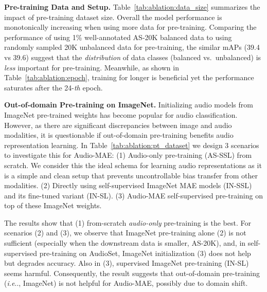 \documentclass{article}
\makeatletter
\DeclareRobustCommand\onedot{\futurelet\@let@token\@onedot}
\def\@onedot{\ifx\@let@token.\else.\null\fi\xspace}
\def\ie{\emph{i.e}\onedot} \def\Ie{\emph{I.e}\onedot}
\renewcommand{\paragraph}[1]{\vspace{1.25mm}\noindent\textbf{#1}}
\makeatother
\begin{document}
\paragraph{Pre-training Data and Setup.}
Table~\ref{tab:ablation:data_size} summarizes the impact of pre-training dataset size. 
Overall the model performance is monotonically increasing when using more data for pre-training.
Comparing the performance of using 1\% well-annotated AS-20K balanced data to using randomly sampled 20K unbalanced data for pre-training, the similar mAPs (39.4 vs 39.6) suggest that the \textit{distribution} of data classes (balanced vs.\ unbalanced) is \textit{less} important for pre-training.
Meanwhile, as shown in Table~\ref{tab:ablation:epoch},
training for longer is beneficial yet the performance saturates after the 24-\textit{th} epoch.


\paragraph{Out-of-domain Pre-training on ImageNet.} 
Initializing audio models from ImageNet pre-trained weights has become popular for audio classification. 
However, as there are significant discrepancies between image and audio modalities, 
it is questionable if out-of-domain pre-training benefits audio representation learning.
In Table~\ref{tab:ablation:pt_dataset} we design 3 scenarios to investigate this for Audio-MAE:
(1) Audio-only pre-training (AS-SSL) from scratch. 
We consider this the ideal schema for learning audio representations as it is a simple and clean setup that prevents uncontrollable bias transfer from other modalities.
(2) Directly using self-supervised ImageNet MAE models (IN-SSL) and its fine-tuned variant (IN-SL).
(3) Audio-MAE self-supervised pre-training on top of these ImageNet weights.


The results show that (1) from-scratch \textit{audio-only} pre-training is the best.
For scenarios (2) and (3), we observe that ImageNet pre-training alone (2) is not sufficient (especially when the downstream data is smaller, AS-20K), and, in self-supervised pre-training on AudioSet, ImageNet initialization (3) does not help but degrades accuracy. 
Also in (3), supervised ImageNet pre-training (IN-SL) seems harmful.
Consequently, the result suggests that out-of-domain pre-training (\ie, ImageNet) is not helpful for Audio-MAE, possibly due to domain shift.
\end{document}
